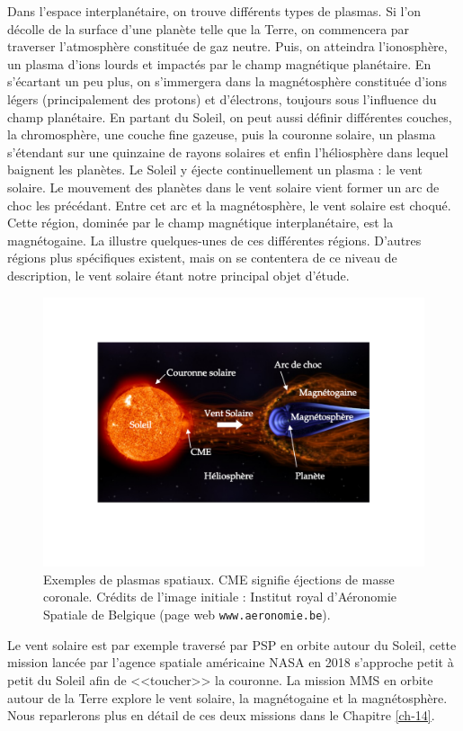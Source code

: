 Dans l'espace interplanétaire, on trouve différents types de plasmas. Si l'on décolle de la surface d'une planète telle que la Terre, on commencera par traverser l'atmosphère constituée de gaz neutre. Puis, on atteindra l'ionosphère, un plasma d'ions lourds et impactés par le champ magnétique planétaire. En s'écartant un peu plus, on s'immergera dans la magnétosphère constituée d'ions légers (principalement des protons) et d'électrons, toujours sous l'influence du champ planétaire. En partant du Soleil, on peut aussi définir différentes couches, la chromosphère, une couche fine gazeuse, puis la couronne solaire, un plasma s'étendant sur une quinzaine de rayons solaires et enfin l'héliosphère dans lequel baignent les planètes. Le Soleil y éjecte continuellement un plasma : le vent solaire.
Le mouvement des planètes dans le vent solaire vient former un arc de choc les précédant. Entre cet arc et la magnétosphère, le vent solaire est choqué. Cette région, dominée par le champ magnétique interplanétaire, est la magnétogaine. La  illustre quelques-unes de ces différentes régions. D'autres régions plus spécifiques existent, mais on se contentera de ce niveau de description, le vent solaire étant notre principal objet d'étude. 
\begin{figure}[!ht]
 \centering
\includegraphics[width=\linewidth,trim=4cm 5cm 4cm 4cm, clip=true]{./Part_0/images/schemes_heliosphere}
\cprotect\caption{Exemples de plasmas spatiaux. \acs{CME} signifie éjections de masse coronale. Crédits de l'image initiale : Institut royal d'Aéronomie Spatiale de Belgique (page web \verb|www.aeronomie.be|).}
\label{fig:régions}
\end{figure}
Le vent solaire est par exemple traversé par \ac{PSP} en orbite autour du Soleil, cette mission lancée par l'agence spatiale américaine \acs{NASA} en 2018 s'approche petit à petit du Soleil afin de <<toucher>> la couronne. La mission \ac{MMS} en orbite autour de la Terre explore le vent solaire, la magnétogaine et la magnétosphère. Nous reparlerons plus en détail de ces deux missions dans le Chapitre \ref{ch-14}. 

